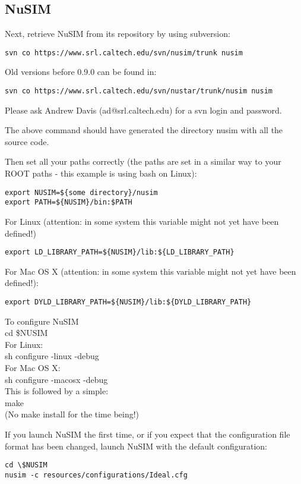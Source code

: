 \subsection{NuSIM}
Next, retrieve NuSIM from its repository by using subversion:
\begin{verbatim}
svn co https://www.srl.caltech.edu/svn/nusim/trunk nusim
\end{verbatim}
Old versions before 0.9.0 can be found in:
\begin{verbatim}
svn co https://www.srl.caltech.edu/svn/nustar/trunk/nusim nusim
\end{verbatim}
Please ask Andrew Davis (ad@srl.caltech.edu) for a svn login and password.

The above command should have generated the directory nusim with all the source code.

Then set all your paths correctly (the paths are set in a similar way to your ROOT paths - this example is using bash on Linux):
\begin{verbatim}
export NUSIM=${some directory}/nusim
export PATH=${NUSIM}/bin:$PATH
\end{verbatim}
For Linux (attention: in some system this variable might not yet have been defined!)
\begin{verbatim}
export LD_LIBRARY_PATH=${NUSIM}/lib:${LD_LIBRARY_PATH}
\end{verbatim}
For Mac OS X (attention: in some system this variable might not yet have been defined!):
\begin{verbatim}
export DYLD_LIBRARY_PATH=${NUSIM}/lib:${DYLD_LIBRARY_PATH}
\end{verbatim}

To configure NuSIM \\
cd \$NUSIM \\
For Linux: \\
sh configure -linux -debug \\
For Mac OS X: \\
sh configure -macosx -debug \\
This is followed by a simple: \\
make \\
(No make install for the time being!)

If you launch NuSIM the first time, or if you expect that the configuration file format has been changed, launch NuSIM with the default configuration:

\begin{verbatim}
cd \$NUSIM
nusim -c resources/configurations/Ideal.cfg
\end{verbatim}

